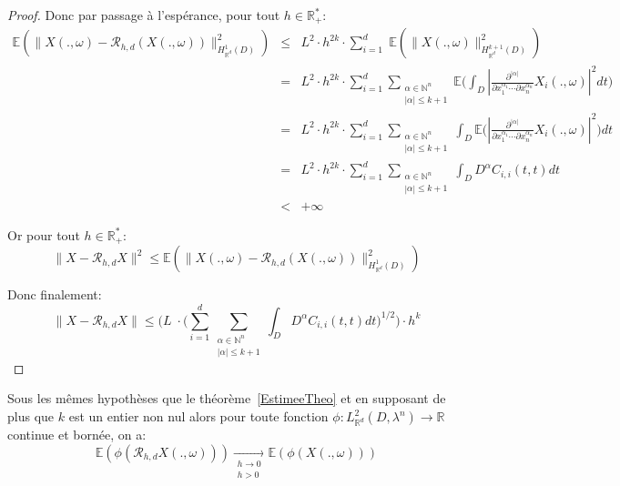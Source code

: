 \begin{proof}
  \noindent Donc par passage à l'espérance, pour tout $h \in \mathbb{R}^{*}_{+}$:
\footnotesize{
  \begin{eqnarray*}
    \mathbb{E}(\|X(.,\omega) - \mathcal{R}_{h,d}(X(.,\omega)) \|_{H^{1}_{\mathbb{R}^d}(D)}^2) &\leq& L^2 \cdot h^{2k} \cdot \displaystyle\sum_{i=1}^{d} \; \mathbb{E}(\|X(.,\omega)\|_{H^{k+1}_{\mathbb{R}^d}(D)}^2) \\
    &=& L^2 \cdot h^{2k} \cdot \displaystyle\sum_{i=1}^{d} \displaystyle\sum_{\substack{\alpha \in \mathbb{N}^n \\  |\alpha| \leq k+1} } \mathbb{E}\biggl(\int_D |\frac{\partial^{|\alpha|}}{\partial x_{1}^{\alpha_1} \cdots \partial x_{n}^{\alpha_n} } X_i(.,\omega)|^2 dt \biggl) \\
    &=& L^2 \cdot h^{2k} \cdot \displaystyle\sum_{i=1}^{d} \displaystyle\sum_{\substack{\alpha \in \mathbb{N}^n \\  |\alpha| \leq k+1} } \int_D \mathbb{E}\biggl(|\frac{\partial^{|\alpha|}}{\partial x_{1}^{\alpha_1} \cdots \partial x_{n}^{\alpha_n} } X_i(.,\omega)|^2 \biggl) dt \\
    &=& L^2 \cdot h^{2k} \cdot \displaystyle\sum_{i=1}^{d} \displaystyle\sum_{\substack{\alpha \in \mathbb{N}^n \\  |\alpha| \leq k+1} } \int_D D^{\alpha}C_{i,i}(t,t) dt \\
    &< &+\infty
  \end{eqnarray*}
}

\normalsize{
\noindent Or pour tout $h \in \mathbb{R}^{*}_{+}$:}
\footnotesize{\begin{equation*}
\|X - \mathcal{R}_{h,d}X\|^2 \leq \mathbb{E}(\|X(.,\omega) - \mathcal{R}_{h,d}(X(.,\omega)) \|_{H^{1}_{\mathbb{R}^d}(D)}^2)
\end{equation*}}

\normalsize{\noindent Donc finalement:}
\footnotesize{\begin{equation*}
\|X - \mathcal{R}_{h,d}X\| \leq \biggl(L \; \cdot \biggl(\displaystyle\sum_{i=1}^{d} \displaystyle\sum_{\substack{\alpha \in \mathbb{N}^n \\  |\alpha| \leq k+1} } \int_D D^{\alpha}C_{i,i}(t,t) dt \biggr)^{1/2} \biggr) \cdot h^k 
\end{equation*}}

\end{proof}

\begin{corollary}
  Sous les mêmes hypothèses que le théorème~\ref{EstimeeTheo} et en supposant de plus que $k$ est un entier non nul
  alors pour toute fonction $\phi: L^2_{\mathbb{R}^d}(D,\lambda^n) \rightarrow \mathbb{R}$ continue et bornée, on a:
  \begin{equation}
   \mathbb{E}(\phi(\mathcal{R}_{h,d}X(.,\omega))) \underset{\substack{h \to 0 \\ h>0}}{\rightarrow} \mathbb{E}(\phi(X(.,\omega)))
  \end{equation}
\end{corollary}

